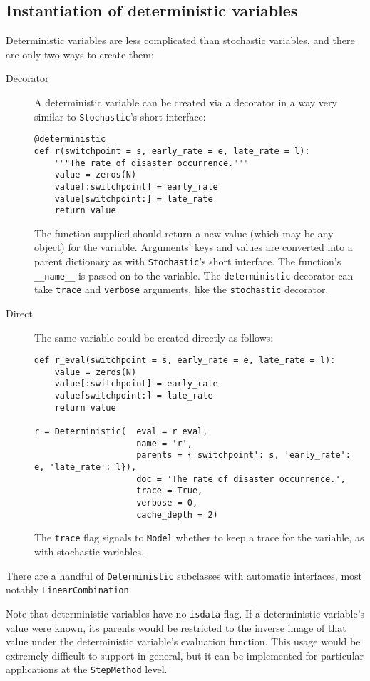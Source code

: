\subsection*{Instantiation of deterministic variables}
Deterministic variables are less complicated than stochastic variables, and there are only two ways to create them:
\begin{description}
    \item[Decorator] A deterministic variable can be created via a decorator in a way very similar to \texttt{Stochastic}'s short interface:
\begin{verbatim}
@deterministic
def r(switchpoint = s, early_rate = e, late_rate = l):
    """The rate of disaster occurrence."""
    value = zeros(N)
    value[:switchpoint] = early_rate
    value[switchpoint:] = late_rate
    return value
\end{verbatim}
The function supplied should return a new value (which may be any object) for the variable. Arguments' keys and values are converted into a parent dictionary as with \texttt{Stochastic}'s short interface. The function's \texttt{__name__} is passed on to the variable. The \texttt{deterministic} decorator can take \texttt{trace} and \texttt{verbose} arguments, like the \texttt{stochastic} decorator.
    \item[Direct] The same variable could be created directly as follows:
\begin{verbatim}
def r_eval(switchpoint = s, early_rate = e, late_rate = l):
    value = zeros(N)
    value[:switchpoint] = early_rate
    value[switchpoint:] = late_rate
    return value

r = Deterministic(  eval = r_eval, 
                    name = 'r',
                    parents = {'switchpoint': s, 'early_rate': e, 'late_rate': l}),
                    doc = 'The rate of disaster occurrence.',
                    trace = True,
                    verbose = 0,
                    cache_depth = 2)
\end{verbatim}
The \texttt{trace} flag signals to \texttt{Model} whether to keep a trace for the variable, as with stochastic variables.
\end{description}

There are a handful of \texttt{Deterministic} subclasses with automatic interfaces, most notably \texttt{LinearCombination}.

Note that deterministic variables have no \texttt{isdata} flag. If a deterministic variable's value were known, its parents would be restricted to the inverse image of that value under the deterministic variable's evaluation function. This usage would be extremely difficult to support in general, but it can be implemented for particular applications at the \texttt{StepMethod} level.

